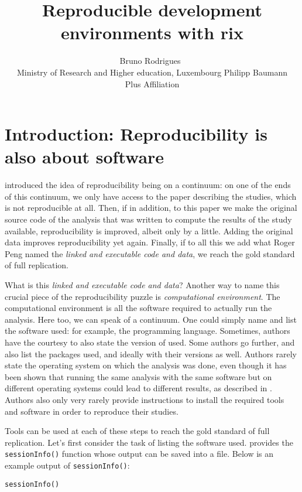 \documentclass[
  article]{jss}
\author{Bruno Rodrigues~\orcidlink{0000-0002-3211-3689}\\Ministry of
Research and Higher education, Luxembourg \And Philipp Baumann\\Plus
Affiliation}
\title{Reproducible development environments with rix}
\begin{document}
\maketitle
\section{Introduction: Reproducibility is also about
software}\label{sec-intro}

\citet{peng2011} introduced the idea of reproducibility being on a
continuum: on one of the ends of this continuum, we only have access to
the paper describing the studies, which is not reproducible at all.
Then, if in addition, to this paper we make the original source code of
the analysis that was written to compute the results of the study
available, reproducibility is improved, albeit only by a little. Adding
the original data improves reproducibility yet again. Finally, if to all
this we add what Roger Peng named the \emph{linked and executable code
and data}, we reach the gold standard of full replication.

What is this \emph{linked and executable code and data}? Another way to
name this crucial piece of the reproducibility puzzle is
\emph{computational environment}. The computational environment is all
the software required to actually run the analysis. Here too, we can
speak of a continuum. One could simply name and list the software used:
for example, the  programming language. Sometimes, authors
have the courtesy to also state the version of  used. Some
authors go further, and also list the packages used, and ideally with
their versions as well. Authors rarely state the operating system on
which the analysis was done, even though it has been shown that running
the same analysis with the same software but on different operating
systems could lead to different results, as described in
\citet{neupane2019}. Authors also only very rarely provide instructions
to install the required tools and software in order to reproduce their
studies.

Tools can be used at each of these steps to reach the gold standard of
full replication. Let's first consider the task of listing the software
used.  provides the \texttt{sessionInfo()} function whose
output can be saved into a file. Below is an example output of
\texttt{sessionInfo()}:

\begin{verbatim}
sessionInfo()
\end{verbatim}
\end{document}
